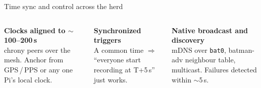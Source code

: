 \documentclass[11pt,aspectratio=169]{beamer}
\begin{document}
\begin{frame}{Time sync and control across the herd}

\begin{columns}[T,onlytextwidth]

\vspace{0.2cm}

\textbf{Clocks aligned to $\sim$100--200\,\textmu s}\\
chrony peers over the mesh. Anchor from GPS\,/\,PPS or any one Pi's local clock.

\medskip
\textbf{Synchronized triggers}\\
A common time $\Rightarrow$ ``everyone start recording at T+5\,s'' just works.

\medskip
\textbf{Native broadcast and discovery}\\
mDNS over \texttt{bat0}, batman-adv neighbour table, multicast. Failures detected within $\sim$5\,s.

\centering
{}

\end{columns}
\end{frame}
\end{document}
